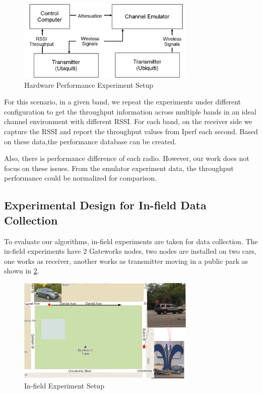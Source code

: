 \begin{figure}
\centering
\includegraphics[width=85mm]{figure/emulator2}
\caption{Hardware Performance Experiment Setup}
\label{fig:in-door experiment}
\end{figure}

For this scenario, in a given band, we repeat the experiments under different configuration to get the throughput information across multiple bands in an ideal channel environment with different RSSI.
For each band, on the receiver side we capture the RSSI and report the throughput values from Iperf \cite{Iperf} each second. Based on these data,the performance database can be created.

Also, there is performance difference of each radio. However, our work does not focus on these issues. From the emulator experiment data, the throughput performance could be normalized for comparison. 


\subsection{Experimental Design for In-field Data Collection}
\label{subsec:insitu}
To evaluate our algorithms, in-field experiments are taken for data collection.
The in-field experiments have 2 Gateworks nodes, two nodes are installed on two cars, one works as receiver, another works as transmitter moving in a public park as shown in \ref{fig:infield}.

\begin{figure}
\centering
\includegraphics[width=85mm]{figure/infield}
\caption{In-field Experiment Setup}
\label{fig:infield}
\end{figure}


